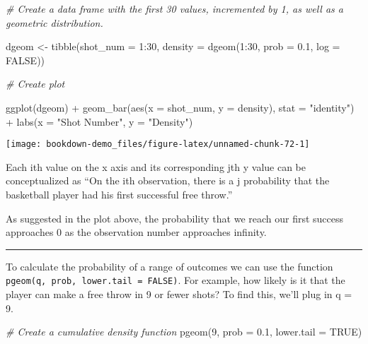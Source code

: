 \documentclass[
]{book}
\newenvironment{Shaded}{\begin{snugshade}}{\end{snugshade}}
\newcommand{\AttributeTok}[1]{\textcolor[rgb]{0.77,0.63,0.00}{#1}}
\newcommand{\CommentTok}[1]{\textcolor[rgb]{0.56,0.35,0.01}{\textit{#1}}}
\newcommand{\ConstantTok}[1]{\textcolor[rgb]{0.00,0.00,0.00}{#1}}
\newcommand{\DecValTok}[1]{\textcolor[rgb]{0.00,0.00,0.81}{#1}}
\newcommand{\FloatTok}[1]{\textcolor[rgb]{0.00,0.00,0.81}{#1}}
\newcommand{\FunctionTok}[1]{\textcolor[rgb]{0.00,0.00,0.00}{#1}}
\newcommand{\NormalTok}[1]{#1}
\newcommand{\OtherTok}[1]{\textcolor[rgb]{0.56,0.35,0.01}{#1}}
\newcommand{\SpecialCharTok}[1]{\textcolor[rgb]{0.00,0.00,0.00}{#1}}
\newcommand{\StringTok}[1]{\textcolor[rgb]{0.31,0.60,0.02}{#1}}
\begin{document}
\begin{Shaded}
\begin{Highlighting}[]
\CommentTok{\# Create a data frame with the first 30 values, incremented by 1, as well as a geometric distribution.}

\NormalTok{dgeom }\OtherTok{\textless{}{-}} \FunctionTok{tibble}\NormalTok{(}\AttributeTok{shot\_num =} \DecValTok{1}\SpecialCharTok{:}\DecValTok{30}\NormalTok{, }
                \AttributeTok{density =} \FunctionTok{dgeom}\NormalTok{(}\DecValTok{1}\SpecialCharTok{:}\DecValTok{30}\NormalTok{, }\AttributeTok{prob =} \FloatTok{0.1}\NormalTok{, }\AttributeTok{log =} \ConstantTok{FALSE}\NormalTok{))}

\CommentTok{\# Create plot}

\FunctionTok{ggplot}\NormalTok{(dgeom) }\SpecialCharTok{+}
  \FunctionTok{geom\_bar}\NormalTok{(}\FunctionTok{aes}\NormalTok{(}\AttributeTok{x =}\NormalTok{ shot\_num, }\AttributeTok{y =}\NormalTok{ density), }\AttributeTok{stat =} \StringTok{"identity"}\NormalTok{) }\SpecialCharTok{+}
  \FunctionTok{labs}\NormalTok{(}\AttributeTok{x =} \StringTok{"Shot Number"}\NormalTok{, }\AttributeTok{y =} \StringTok{"Density"}\NormalTok{)}
\end{Highlighting}
\end{Shaded}

\begin{center}\texttt{[image: bookdown-demo\_files/figure-latex/unnamed-chunk-72-1]} \end{center}

Each ith value on the x axis and its corresponding jth y value can be conceptualized as ``On the ith observation, there is a j probability that the basketball player had his first successful free throw.''

As suggested in the plot above, the probability that we reach our first success approaches 0 as the observation number approaches infinity.

\begin{center}\rule{0.5\linewidth}{0.5pt}\end{center}

To calculate the probability of a range of outcomes we can use the function \texttt{pgeom(q,\ prob,\ lower.tail\ =\ FALSE)}. For example, how likely is it that the player can make a free throw in 9 or fewer shots? To find this, we'll plug in q = 9.

\begin{Shaded}
\begin{Highlighting}[]
\CommentTok{\# Create a cumulative density function}
\FunctionTok{pgeom}\NormalTok{(}\DecValTok{9}\NormalTok{, }\AttributeTok{prob =} \FloatTok{0.1}\NormalTok{, }\AttributeTok{lower.tail =} \ConstantTok{TRUE}\NormalTok{)}
\end{Highlighting}
\end{Shaded}
\end{document}
